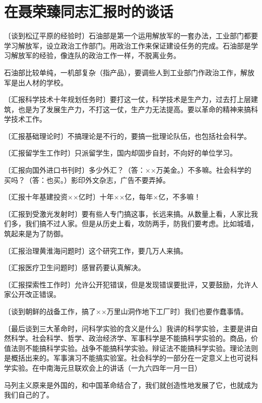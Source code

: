 \section[在聂荣臻同志汇报时的谈话（一九六三年十二月）]{在聂荣臻同志汇报时的谈话}


〔谈到松辽平原的经验时〕石油部是第一个运用解放军的一套办法，工业部门都要学习解放军，设立政治工作部门。用政治工作来保证建设任务的完成。石油部是学习解放军的经验，像连队的政治工作一样，不脱离业务。

石油部比较单纯，一机部复杂（指产品），要调些人到工业部门作政治工作，解放军是出人材的学校。

〔汇报科学技术十年规划任务时〕要打这一仗，科学技术是生产力，过去打上层建筑，也是为了发展生产力，不打这一仗，生产力无法提高。要以革命的精神来搞科学技术工作。

〔汇报基础理论时〕不搞理论是不行的，要搞一批理论队伍，也包括社会科学。

〔汇报留学生工作时〕只派留学生，国内却固步自封，不向好的单位学习。

〔汇报向国外进口书刊时〕多少外汇？（答：××万美金。）不多嘛。社会科学的买吗？（答：也买。）影印外文杂志，广告不要弄掉。

〔汇报十年基建投资××亿时〕十年××亿，每年×亿，不多嘛！

〔汇报到受激光发射时〕要有些人专门搞这事，长远来搞。从数量上看，人家比我们多，我们搞不过人家。但是从历史上看，攻防两手，防我们要考虑。比如城墙，筑起来是为了防御。

〔汇报治理黄淮海问题时〕这个研究工作，要几万人来搞。

〔汇报医疗卫生问题时〕感冒药要认真解决。

〔汇报探索性工作时〕允许公开犯错误，但是发现错误要批评，又要鼓励，允许人家公开改正错误。

〔谈到朝鲜的战备工作，搞了××万里山洞作地下工厂时〕我们也要作蠢事情。

〔最后谈到三大革命时，问科学实验的含义是什么〕我讲的科学实验，主要是讲自然科学。社会科学、哲学、政治经济学、军事科学是不能搞科学实验的。商品，价值法则不能搞科学实验。战争不能搞科学实验。辩证法不能搞科学实验。理论法则是概括出来的。军事演习不能搞实验室。社会科学的一部分在一定意义上也可说科学实验。在中南海元旦联欢会上的讲话（一九六四年一月一日）

马列主义原来是外国的，和中国革命结合了，我们就创造性地发展了它，也就成为我们自己的了。


